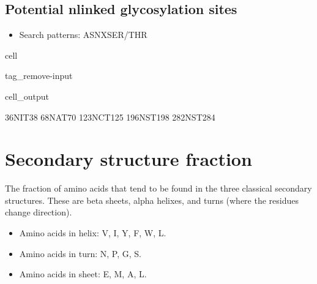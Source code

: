 \documentclass[letterpaper,10pt,english]{jupyterBook}
\begin{document}
\subsection{Potential n\sphinxhyphen{}linked glycosylation sites}
\label{\detokenize{ipynb/chapter1:potential-n-linked-glycosylation-sites}}\begin{itemize}
\item {} 
\sphinxAtStartPar
Search patterns: ASN\sphinxhyphen{}X\sphinxhyphen{}SER/THR

\end{itemize}

\begin{sphinxuseclass}{cell}
\begin{sphinxuseclass}{tag_remove-input}\begin{sphinxVerbatimOutput}

\begin{sphinxuseclass}{cell_output}
\begin{sphinxVerbatim}[commandchars=\\\{\}]
36\PYGZhy{}NIT\PYGZhy{}38
68\PYGZhy{}NAT\PYGZhy{}70
123\PYGZhy{}NCT\PYGZhy{}125
196\PYGZhy{}NST\PYGZhy{}198
282\PYGZhy{}NST\PYGZhy{}284
\end{sphinxVerbatim}

\end{sphinxuseclass}\end{sphinxVerbatimOutput}

\end{sphinxuseclass}
\end{sphinxuseclass}

\section{Secondary structure fraction}
\label{\detokenize{ipynb/chapter1:secondary-structure-fraction}}
\sphinxAtStartPar
The fraction of amino acids that tend to be found in the three classical secondary structures. These are beta sheets, alpha helixes, and turns (where the residues change direction).
\begin{itemize}
\item {} 
\sphinxAtStartPar
Amino acids in helix: V, I, Y, F, W, L.

\item {} 
\sphinxAtStartPar
Amino acids in turn: N, P, G, S.

\item {} 
\sphinxAtStartPar
Amino acids in sheet: E, M, A, L.

\end{itemize}
\end{document}
